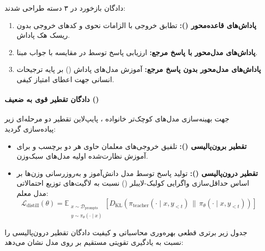 دادگان بازخورد در ۳ دسته طراحی شدند:
\begin{enumerate}
    \item \textbf{پاداش‌های قاعده‌محور ():} تطابق خروجی با الزامات نحوی و کدهای خروجی بدون ریسک هک پاداش.
    \item \textbf{پاداش‌های مدل‌محور با پاسخ مرجع:} ارزیابی پاسخ توسط  در مقایسه با جواب مبنا.
    \item \textbf{پاداش‌های مدل‌محور بدون پاسخ مرجع:} آموزش مدل‌های پاداش () بر پایه ترجیحات انسانی جهت اعطای امتیاز کیفی.
\end{enumerate}

\paragraph*{دادگان تقطیر قوی به ضعیف ()}
جهت بهینه‌سازی مدل‌های کوچک‌تر خانواده ، پایپ‌لاین تقطیر دو مرحله‌ای زیر پیاده‌سازی گردید:
\begin{itemize}
    \item \textbf{تقطیر برون‌پالیسی ():} تلفیق خروجی‌های معلمان حاوی هر دو برچسب  و  برای آموزش نظارت‌شده اولیه مدل‌های سبک‌وزن.
    \item \textbf{تقطیر درون‌پالیسی ():} تولید پاسخ توسط مدل دانش‌آموز و به‌روزرسانی وزن‌ها بر اساس حداقل‌سازی واگرایی کولبک-لایبلر () نسبت به لاگیت‌های توزیع احتمالاتی مدل معلم:
    \begin{equation}
        \mathcal{L}_{\text{distill}}(\theta) = \mathbb{E}_{\substack{x \sim \mathcal{D}_{\text{prompts}} \\ y \sim \pi_\theta(\cdot \mid x)}} \left[ D_{\text{KL}}\left( \pi_{\text{teacher}}(\cdot \mid x, y_{<t}) \,\|\, \pi_\theta(\cdot \mid x, y_{<t}) \right) \right]
    \end{equation}
\end{itemize}

جدول زیر برتری قطعی بهره‌وری محاسباتی و کیفیت دادگان تقطیر درون‌پالیسی را نسبت به یادگیری تقویتی مستقیم بر روی مدل  نشان می‌دهد:

